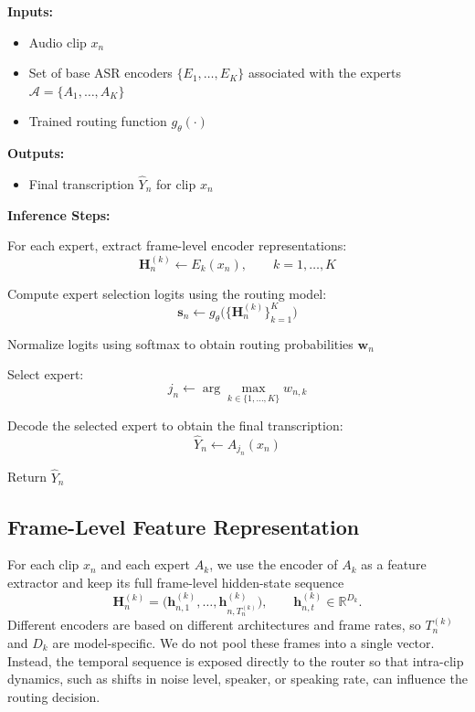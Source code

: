 \documentclass[journal]{IEEEtran}
\begin{document}
\begin{algorithm}
\small
\caption{\small Online ASR Model Selection}
\label{alg:online_overview}

\textbf{Inputs:}
\begin{itemize}
    \item Audio clip $x_n$
    \item Set of base ASR encoders $\{E_1,\dots,E_K\}$ associated with the experts $\mathcal{A}=\{A_1,\dots,A_K\}$
    \item Trained routing function $g_{\theta}(\cdot)$
\end{itemize}

\textbf{Outputs:}
\begin{itemize}
    \item Final transcription $\widehat{Y}_n$ for clip $x_n$
\end{itemize}

\textbf{Inference Steps:}
\begin{algorithmic}[1]

\State For each expert, extract frame-level encoder representations:
\[
\mathbf{H}_n^{(k)} \leftarrow E_k(x_n), \qquad k=1,\dots,K
\]

\State Compute expert selection logits using the routing model:
\[
\mathbf{s}_n \leftarrow g_{\theta}\bigl(\{\mathbf{H}_n^{(k)}\}_{k=1}^{K}\bigr)
\]

\State Normalize logits using softmax to obtain routing probabilities $\mathbf{w}_n$

\State Select expert:
\[
j_n \leftarrow \arg\max_{k \in \{1,\dots,K\}} w_{n,k}
\]

\State Decode the selected expert to obtain the final transcription:
\[
\widehat{Y}_n \leftarrow A_{j_n}(x_n)
\]

\State Return $\widehat{Y}_n$

\end{algorithmic}
\end{algorithm}


\subsection{Frame-Level Feature Representation}
\label{sec:features}

For each clip $x_n$ and each expert $A_k$, we use the encoder of
$A_k$ as a feature extractor and keep its full frame-level
hidden-state sequence
\[
\mathbf{H}_n^{(k)}=
\bigl(\mathbf{h}_{n,1}^{(k)},\dots,\mathbf{h}_{n,T_n^{(k)}}^{(k)}\bigr),
\qquad
\mathbf{h}_{n,t}^{(k)}\in\mathbb{R}^{D_k}.
\]
Different encoders are based on different architectures and frame
rates, so $T_n^{(k)}$ and $D_k$ are model-specific. We do not pool
these frames into a single vector. Instead, the temporal sequence is
exposed directly to the router so that intra-clip dynamics, such as
shifts in noise level, speaker, or speaking rate, can influence the
routing decision.
\end{document}
